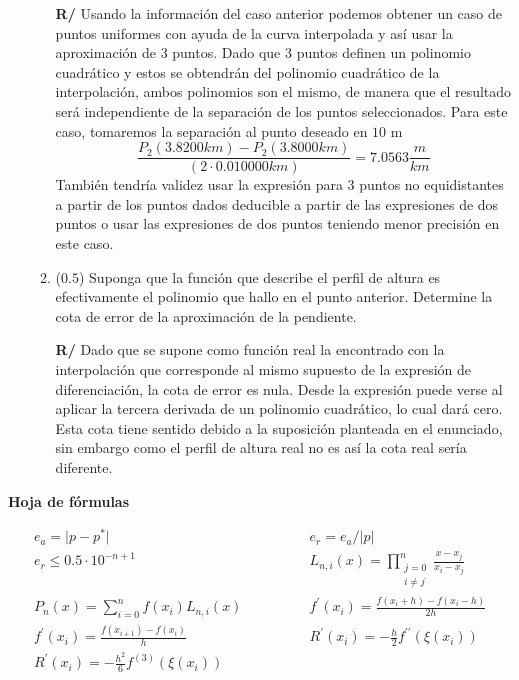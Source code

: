 \documentclass[12pt]{article}
\begin{document}
\begin{enumerate}[leftmargin=*,widest=9]
\begin{enumerate}[label=\alph*]
\textbf{R/} Usando la información del caso anterior podemos obtener un caso de puntos uniformes con ayuda de la curva interpolada y así usar la aproximación de 3 puntos.
Dado que 3 puntos definen un polinomio cuadrático y estos se obtendrán del polinomio cuadrático de la interpolación, ambos polinomios son el mismo, de manera que el resultado será independiente de la separación de los puntos seleccionados. Para este caso, tomaremos la separación al punto deseado en \(10\) m
\[ \frac{P_2(3.8200 km) - P_2(3.8000 km)}{(2 \cdot 0.010000 km)} = 7.0563 \frac{m}{km}\]
También tendría validez usar la expresión para 3 puntos no equidistantes a partir de los puntos dados deducible a partir de las expresiones de dos puntos o usar las expresiones de dos puntos teniendo menor precisión en este caso.
   \item (\(0.5\)) Suponga que la función que describe el perfil de altura es efectivamente el polinomio que hallo en el punto anterior. Determine la cota de error de la aproximación de la pendiente.

\textbf{R/} Dado que se supone como función real la encontrado con la interpolación que corresponde al mismo supuesto de la expresión de diferenciación, la cota de error es nula. Desde la expresión puede verse al aplicar la tercera derivada de un polinomio cuadrático, lo cual dará cero.
   Esta cota tiene sentido debido a la suposición planteada en el enunciado, sin embargo como el perfil de altura real no es así la cota real sería diferente.
   \end{enumerate}
\end{enumerate}
\begin{center}
\textbf{Hoja de fórmulas}
\end{center}
{\large
\[
\begin{array}{cc}
e_a = \vert p - p^* \vert \qquad & \qquad e_r = e_a/\vert p \vert \\
e_r \leq 0.5 \cdot 10^{-n+1} \qquad & \qquad
L_{n, i}(x) = \prod\limits_{\substack{j=0\\ i \neq j}}^n \frac{x - x_j}{x_i - x_j} \\
P_n(x) = \sum\limits_{i = 0}^n f(x_i)L_{n,i}(x)  \qquad & \qquad f^\prime(x_i) = \frac{f(x_i + h) - f(x_i - h)}{2h}\\
f^\prime(x_i) = \frac{f(x_{i+1})-f(x_i)}{h} \qquad & \qquad
R^\prime(x_i) = -\frac{h}{2}f^{\prime\prime}(\xi(x_i)) \\
R^\prime(x_i) = -\frac{h^2}{6}f^{(3)}(\xi(x_i)) &
\end{array}
\]
}
\end{document}
